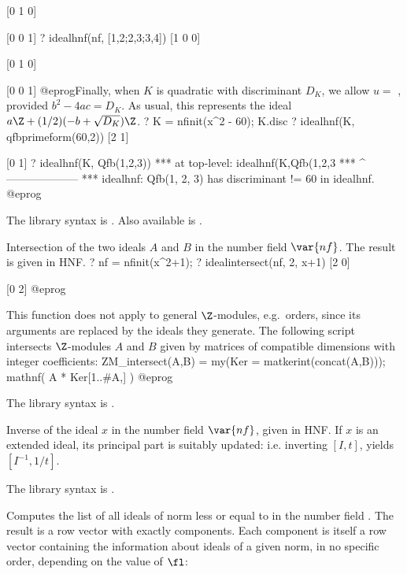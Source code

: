 [0 1 0]

[0 0 1]
? idealhnf(nf, [1,2;2,3;3,4])
[1 0 0]

[0 1 0]

[0 0 1]
@eprog\noindent Finally, when $K$ is quadratic with discriminant $D_K$, we
allow $u =$ , provided $b^2 - 4ac = D_K$. As usual,
this represents the ideal $a \Z + (1/2)(-b + \sqrt{D_K}) \Z$.
\bprog
? K = nfinit(x^2 - 60); K.disc
? idealhnf(K, qfbprimeform(60,2))
[2 1]

[0 1]
? idealhnf(K, Qfb(1,2,3))
  ***   at top-level: idealhnf(K,Qfb(1,2,3
  ***                 ^--------------------
  *** idealhnf: Qfb(1, 2, 3) has discriminant != 60 in idealhnf.
@eprog

The library syntax is .
Also available is .

\label{se:idealintersect}
Intersection of the two ideals
$A$ and $B$ in the number field $\var{nf}$. The result is given in HNF.
\bprog
? nf = nfinit(x^2+1);
? idealintersect(nf, 2, x+1)
[2 0]

[0 2]
@eprog

This function does not apply to general $\Z$-modules, e.g.~orders, since its
arguments are replaced by the ideals they generate. The following script
intersects $\Z$-modules $A$ and $B$ given by matrices of compatible
dimensions with integer coefficients:
\bprog
ZM_intersect(A,B) =
{ my(Ker = matkerint(concat(A,B)));
  mathnf( A * Ker[1..#A,] )
}
@eprog

The library syntax is .

\label{se:idealinv}
Inverse of the ideal $x$ in the
number field $\var{nf}$, given in HNF. If $x$ is an extended
ideal, its principal part is suitably
updated: i.e. inverting $[I,t]$, yields $[I^{-1}, 1/t]$.

The library syntax is .

\label{se:ideallist}
Computes the list
of all ideals of norm less or equal to  in the number field
. The result is a row vector with exactly  components.
Each component is itself a row vector containing the information about
ideals of a given norm, in no specific order, depending on the value of
$\fl$:

